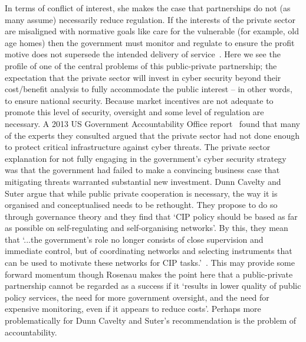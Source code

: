 \documentclass[a4paper,11pt]{article}
\begin{document}
In terms of conflict of interest, she makes the case that partnerships
do not (as many assume) necessarily reduce regulation. If the
interests of the private sector are misaligned with normative goals
like care for the vulnerable (for example, old age homes) then the
government must monitor and regulate to ensure the profit motive does
not supersede the intended delivery of service~\cite{rosenau:1999}.
Here we see the profile of one of the central problems of this
public-private partnership; the expectation that the private sector
will invest in cyber security beyond their cost/benefit analysis to
fully accommodate the public interest -- in other words, to ensure
national security. Because market incentives are not adequate to
promote this level of security, oversight and some level of regulation
are necessary. A 2013 US Government Accountability Office
report~\cite{usgao:2013} found that many of the experts they consulted
argued that the private sector had not done enough to protect critical
infrastructure against cyber threats. The private sector explanation
for not fully engaging in the government’s cyber security strategy was
that the government had failed to make a convincing business case that
mitigating threats warranted substantial new investment.  Dunn Cavelty
and Suter argue that while public private cooperation is necessary,
the way it is organised and conceptualised needs to be rethought. They
propose to do so through governance theory and they find that `CIP
policy should be based as far as possible on self-regulating and
self-organising networks'. By this, they mean that `...the
government’s role no longer consists of close supervision and
immediate control, but of coordinating networks and selecting
instruments that can be used to motivate these networks for CIP
tasks.'~\cite{dunncavelty+suter:2009}. This may provide some forward
momentum though Rosenau makes the point here that a
public-private partnership cannot be regarded as a success if it
`results in lower quality of public policy services, the need for more
government oversight, and the need for expensive monitoring, even if
it appears to reduce costs'. Perhaps more problematically for Dunn
Cavelty and Suter’s recommendation is the problem of accountability.
\end{document}
